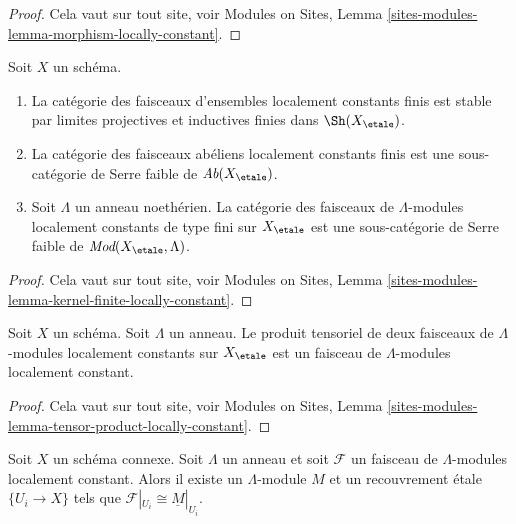 \begin{proof}
Cela vaut sur tout site, voir
Modules on Sites, Lemma \ref{sites-modules-lemma-morphism-locally-constant}.
\end{proof}

\begin{lemma}
\label{lemma-kernel-finite-locally-constant}
Soit $X$ un sch\'ema.
\begin{enumerate}
\item La cat\'egorie des faisceaux d'ensembles localement constants finis
est stable par limites projectives et inductives finies dans $\Sh(X_\etale)$.
\item La cat\'egorie des faisceaux ab\'eliens localement constants finis est une
sous-cat\'egorie de Serre faible de $\textit{Ab}(X_\etale)$.
\item Soit $\Lambda$ un anneau noeth\'erien. La cat\'egorie des
faisceaux de $\Lambda$-modules localement constants de type fini sur
$X_\etale$ est une sous-cat\'egorie de Serre faible de
$\textit{Mod}(X_\etale, \Lambda)$.
\end{enumerate}
\end{lemma}

\begin{proof}
Cela vaut sur tout site, voir
Modules on Sites, Lemma
\ref{sites-modules-lemma-kernel-finite-locally-constant}.
\end{proof}

\begin{lemma}
\label{lemma-tensor-product-locally-constant}
Soit $X$ un sch\'ema. Soit $\Lambda$ un anneau.
Le produit tensoriel de deux faisceaux de $\Lambda$-modules localement constants
sur $X_\etale$ est un faisceau de $\Lambda$-modules localement constant.
\end{lemma}

\begin{proof}
Cela vaut sur tout site, voir
Modules on Sites, Lemma
\ref{sites-modules-lemma-tensor-product-locally-constant}.
\end{proof}

\begin{lemma}
\label{lemma-connected-locally-constant}
Soit $X$ un sch\'ema connexe. Soit $\Lambda$ un anneau et soit
$\mathcal{F}$ un faisceau de $\Lambda$-modules localement constant.
Alors il existe un $\Lambda$-module $M$ et un recouvrement \'etale
$\{U_i \to X\}$ tels que $\mathcal{F}|_{U_i} \cong \underline{M}|_{U_i}$.
\end{lemma}

